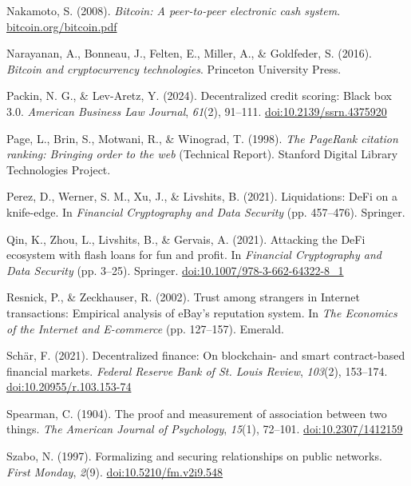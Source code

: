 \begin{enumerate}[label={[\arabic*]}, leftmargin=*, itemsep=0.35em, parsep=0pt]
  \item{}\label{ref:46} Nakamoto, S. (2008). \textit{Bitcoin: A peer-to-peer electronic cash system}. \href{https://bitcoin.org/bitcoin.pdf}{bitcoin.org/bitcoin.pdf}
  \item{}\label{ref:47} Narayanan, A., Bonneau, J., Felten, E., Miller, A., \& Goldfeder, S. (2016). \textit{Bitcoin and cryptocurrency technologies}. Princeton University Press.
  \item{}\label{ref:48} Packin, N. G., \& Lev-Aretz, Y. (2024). Decentralized credit scoring: Black box 3.0. \textit{American Business Law Journal}, \textit{61}(2), 91--111. \href{https://doi.org/10.2139/ssrn.4375920}{doi:10.2139/ssrn.4375920}
  \item{}\label{ref:49} Page, L., Brin, S., Motwani, R., \& Winograd, T. (1998). \textit{The PageRank citation ranking: Bringing order to the web} (Technical Report). Stanford Digital Library Technologies Project.
  \item{}\label{ref:50} Perez, D., Werner, S. M., Xu, J., \& Livshits, B. (2021). Liquidations: DeFi on a knife-edge. In \textit{Financial Cryptography and Data Security} (pp. 457--476). Springer.
  \item{}\label{ref:51} Qin, K., Zhou, L., Livshits, B., \& Gervais, A. (2021). Attacking the DeFi ecosystem with flash loans for fun and profit. In \textit{Financial Cryptography and Data Security} (pp. 3--25). Springer. \href{https://doi.org/10.1007/978-3-662-64322-8_1}{doi:10.1007/978-3-662-64322-8\_1}
  \item{}\label{ref:52} Resnick, P., \& Zeckhauser, R. (2002). Trust among strangers in Internet transactions: Empirical analysis of eBay's reputation system. In \textit{The Economics of the Internet and E-commerce} (pp. 127--157). Emerald.
  \item{}\label{ref:53} Sch\"{a}r, F. (2021). Decentralized finance: On blockchain- and smart contract-based financial markets. \textit{Federal Reserve Bank of St. Louis Review}, \textit{103}(2), 153--174. \href{https://doi.org/10.20955/r.103.153-74}{doi:10.20955/r.103.153-74}
  \item{}\label{ref:54} Spearman, C. (1904). The proof and measurement of association between two things. \textit{The American Journal of Psychology}, \textit{15}(1), 72--101. \href{https://doi.org/10.2307/1412159}{doi:10.2307/1412159}
  \item{}\label{ref:55} Szabo, N. (1997). Formalizing and securing relationships on public networks. \textit{First Monday}, \textit{2}(9). \href{https://doi.org/10.5210/fm.v2i9.548}{doi:10.5210/fm.v2i9.548}

\end{enumerate}
